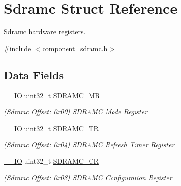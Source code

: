 \hypertarget{structSdramc}{}\section{Sdramc Struct Reference}
\label{structSdramc}


\mbox{\hyperlink{structSdramc}{Sdramc}} hardware registers.  




{\ttfamily \#include $<$component\+\_\+sdramc.\+h$>$}

\subsection*{Data Fields}
\begin{DoxyCompactItemize}
\item 
\mbox{\label{structSdramc_af2d458a78e4c77f355f21cab77f9f1a6}} 
\mbox{\hyperlink{core__cm7_8h_aec43007d9998a0a0e01faede4133d6be}{\+\_\+\+\_\+\+IO}} uint32\+\_\+t \mbox{\hyperlink{structSdramc_af2d458a78e4c77f355f21cab77f9f1a6}{S\+D\+R\+A\+M\+C\+\_\+\+MR}}
\begin{DoxyCompactList}\small\item\em (\mbox{\hyperlink{structSdramc}{Sdramc}} Offset\+: 0x00) S\+D\+R\+A\+MC Mode Register \end{DoxyCompactList}\item 
\mbox{\label{structSdramc_a03181151411a263f647c5a9c5cfeb5a7}} 
\mbox{\hyperlink{core__cm7_8h_aec43007d9998a0a0e01faede4133d6be}{\+\_\+\+\_\+\+IO}} uint32\+\_\+t \mbox{\hyperlink{structSdramc_a03181151411a263f647c5a9c5cfeb5a7}{S\+D\+R\+A\+M\+C\+\_\+\+TR}}
\begin{DoxyCompactList}\small\item\em (\mbox{\hyperlink{structSdramc}{Sdramc}} Offset\+: 0x04) S\+D\+R\+A\+MC Refresh Timer Register \end{DoxyCompactList}\item 
\mbox{\label{structSdramc_ad5289b590d79aa35b2fc67f8dd541472}} 
\mbox{\hyperlink{core__cm7_8h_aec43007d9998a0a0e01faede4133d6be}{\+\_\+\+\_\+\+IO}} uint32\+\_\+t \mbox{\hyperlink{structSdramc_ad5289b590d79aa35b2fc67f8dd541472}{S\+D\+R\+A\+M\+C\+\_\+\+CR}}
\begin{DoxyCompactList}\small\item\em (\mbox{\hyperlink{structSdramc}{Sdramc}} Offset\+: 0x08) S\+D\+R\+A\+MC Configuration Register \end{DoxyCompactList}\item 

\end{DoxyCompactItemize}
